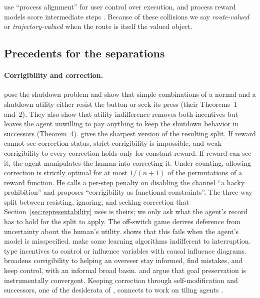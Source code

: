 \documentclass[11pt]{article}
\begin{document}
\textcite{terry2023interactive} use ``process alignment'' for user control over execution, and process reward models score intermediate steps \parencite{lightman2023verify}.
Because of these collisions we say \emph{route-valued} or \emph{trajectory-valued} when the route is itself the valued object.

\subsection{Precedents for the separations}

\paragraph{Corrigibility and correction.}
\textcite{soares2015corrigibility} pose the shutdown problem and show that simple combinations of a normal and a shutdown utility either resist the button or seek its press (their Theorems~1 and~2).
They also show that utility indifference \parencite{armstrong2010indifference} removes both incentives but leaves the agent unwilling to pay anything to keep the shutdown behavior in successors (Theorem~4).
\textcite{turner2021corrigibilityvnm} gives the sharpest version of the resulting split.
If reward cannot see correction status, strict corrigibility is impossible, and weak corrigibility to every correction holds only for constant reward.
If reward can see it, the agent manipulates the human into correcting it.
Under counting, allowing correction is strictly optimal for at most $1/(n+1)$ of the permutations of a reward function.
He calls a per-step penalty on disabling the channel ``a hacky prohibition'' and proposes ``corrigibility as functional constraints''.
The three-way split between resisting, ignoring, and seeking correction that Section~\ref{sec:representability} uses is theirs; we only ask what the agent's record has to hold for the split to apply.
The off-switch game \parencite{hadfieldmenell2017offswitch} derives deference from uncertainty about the human's utility.
\textcite{carey2018incorrigibility} shows that this fails when the agent's model is misspecified.
\textcite{orseau2016interruptible} make some learning algorithms indifferent to interruption.
\textcite{everitt2021agentincentives} type incentives to control or influence variables with causal influence diagrams.
\textcite{christiano2018corrigibility} broadens corrigibility to helping an overseer stay informed, find mistakes, and keep control, with an informal broad basin.
\textcite{omohundro2008basic} and \textcite{bostrom2014superintelligence} argue that goal preservation is instrumentally convergent.
Keeping correction through self-modification and successors, one of the desiderata of \textcite{soares2015corrigibility}, connects to work on tiling agents \parencite{yudkowsky2013tiling}.
\end{document}
